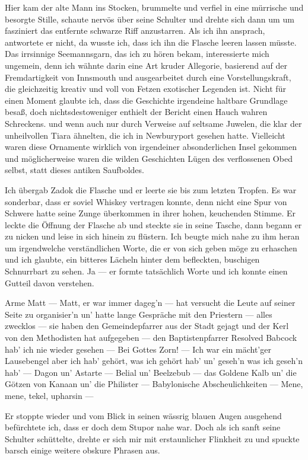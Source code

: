 Hier kam der alte Mann ins Stocken, brummelte und verfiel in eine mürrische und besorgte Stille, schaute nervös über seine Schulter und drehte sich dann um um fasziniert das entfernte schwarze Riff anzustarren. Als ich ihn ansprach, antwortete er nicht, da wusste ich, dass ich ihn die Flasche leeren lassen müsste. Das irrsinnige Seemannsgarn, das ich zu hören bekam, interessierte mich ungemein, denn ich wähnte darin eine Art kruder Allegorie, basierend auf der Fremdartigkeit von Innsmouth und ausgearbeitet durch eine Vorstellungskraft, die gleichzeitig kreativ und voll von Fetzen exotischer Legenden ist. Nicht für einen Moment glaubte ich, dass die Geschichte irgendeine haltbare Grundlage besaß, doch nichtsdestoweniger enthielt der Bericht einen Hauch wahren Schreckens. und wenn auch nur durch Verweise auf seltsame Juwelen, die klar der unheilvollen Tiara ähnelten, die ich in Newburyport gesehen hatte. Vielleicht waren diese Ornamente wirklich von irgendeiner absonderlichen Insel gekommen und möglicherweise waren die wilden Geschichten Lügen des verflossenen Obed selbst, statt dieses antiken Saufboldes.

Ich übergab Zadok die Flasche und er leerte sie bis zum letzten Tropfen. Es war sonderbar, dass er soviel Whiskey vertragen konnte, denn nicht eine Spur von Schwere hatte seine Zunge überkommen in ihrer hohen, keuchenden Stimme. Er leckte die Öffnung der Flasche ab und steckte sie in seine Tasche, dann begann er zu nicken und leise in sich hinein zu flüstern. Ich beugte mich nahe zu ihm heran um irgendwelche verständlichen Worte, die er von sich geben möge zu erhaschen und ich glaubte, ein bitteres Lächeln hinter dem befleckten, buschigen Schnurrbart zu sehen. Ja --- er formte tatsächlich Worte und ich konnte einen Gutteil davon verstehen.

\glqq Arme Matt --- Matt, er war immer dageg'n --- hat versucht die Leute auf seiner Seite zu organisier'n un' hatte lange Gespräche mit den Priestern --- alles zwecklos --- sie haben den Gemeindepfarrer aus der Stadt gejagt und der Kerl von den Methodisten hat aufgegeben --- den Baptistenpfarrer Resolved Babcock hab' ich nie wieder gesehen --- Bei Gottes Zorn! --- Ich war ein mächt'ger Lausebengel aber ich hab' gehört, was ich gehört hab' un' geseh'n was ich geseh'n hab' --- Dagon un' Astarte --- Belial un' Beelzebub --- das Goldene Kalb un' die Götzen von Kanaan un' die Philister --- Babylonische Abscheulichkeiten --- Mene, mene, tekel, upharsin ---\grqq

Er stoppte wieder und vom Blick in seinen wässrig blauen Augen ausgehend befürchtete ich, dass er doch dem Stupor nahe war. Doch als ich sanft seine Schulter schüttelte, drehte er sich mir mit erstaunlicher Flinkheit zu und spuckte barsch einige weitere obskure Phrasen aus.


